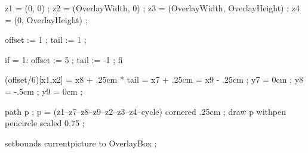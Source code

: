 %
%

%
  z1 = (0, 0) ;
  z2 = (OverlayWidth, 0) ;
  z3 = (OverlayWidth, OverlayHeight) ;
  z4 = (0, OverlayHeight) ;

  offset := 1 ;
  tail := 1 ;

  if  = 1:
    offset := 5 ;
    tail := -1 ;
  fi

  (offset/6)[x1,x2] = x8 + .25cm * tail = x7 + .25cm = x9 - .25cm ;
  y7 =  0cm ;
  y8 = -.5cm ;
  y9 =  0cm ;

  path p ;
  p = (z1--z7--z8--z9--z2--z3--z4--cycle) cornered .25cm ;
  draw p withpen pencircle scaled 0.75 ;

  setbounds currentpicture to OverlayBox ;
\stopuseMPgraphic






